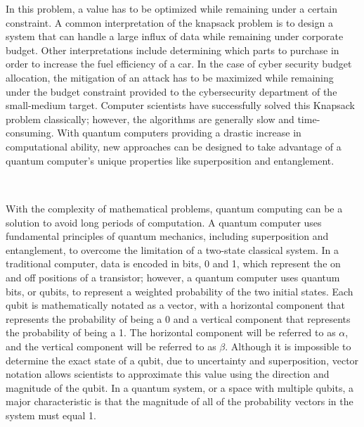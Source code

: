 In this problem, a value has to be optimized while remaining under a certain constraint. A common interpretation of the knapsack problem is to design a system that can handle a large influx of data while remaining under corporate budget. Other interpretations include determining which parts to purchase in order to increase the fuel efficiency of a car. In the case of cyber security budget allocation, the mitigation of an attack has to be maximized while remaining under the budget constraint provided to the cybersecurity department of the small-medium target. Computer scientists have successfully solved this Knapsack problem classically; however, the algorithms are generally slow and time-consuming. With quantum computers providing a drastic increase in computational ability, new approaches can be designed to take advantage of a quantum computer’s unique properties like superposition and entanglement.

\subsection*{\color{SubSectionBlue}{Quantum Systems}}
 \\

With the complexity of mathematical problems, quantum computing can be a solution to avoid long periods of computation. A quantum computer uses fundamental principles of quantum mechanics, including superposition and entanglement, to overcome the limitation of a two-state classical system. In a traditional computer, data is encoded in bits, 0 and 1, which represent the on and off positions of a transistor; however, a quantum computer uses quantum bits, or qubits, to represent a weighted probability of the two initial states. Each qubit is mathematically notated as a vector, with a horizontal component that represents the probability of being a 0 and a vertical component that represents the probability of being a 1. The horizontal component will be referred to as $\alpha$, and the vertical component will be referred to as $\beta$. Although it is impossible to determine the exact state of a qubit, due to uncertainty and superposition, vector notation allows scientists to approximate this value using the direction and magnitude of the qubit. In a quantum system, or a space with multiple qubits, a major characteristic is that the magnitude of all of the probability vectors in the system must equal 1.
\vspace{1mm}

